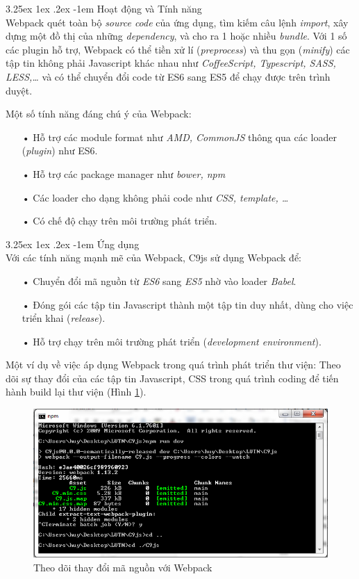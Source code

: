 \documentclass[12pt,a4paper,twoside]{article}
\makeatletter
\newcommand{\myparagraph}[1]{\paragraph{#1}\mbox{}\\} %
\renewcommand\paragraph{\@startsection{paragraph}{5}{\z@}%
  {3.25ex \@plus1ex \@minus.2ex}%
  {-1em}%
  {\normalfont\normalsize\bfseries}}
\makeatother
\begin{document}
\myparagraph{Hoạt động và Tính năng}
Webpack quét toàn bộ \textit{source code} của ứng dụng, tìm kiếm câu lệnh \textit{import}, xây dựng một đồ thị của những \textit{dependency}, và cho ra 1 hoặc nhiều \textit{bundle}. Với 1 số các plugin hỗ trợ, Webpack có thể tiền xử lí (\textit{preprocess}) và thu gọn (\textit{minify}) các tập tin không phải Javascript khác nhau như \textit{CoffeeScript, Typescript, SASS, LESS,…} và có thể chuyển đổi code từ ES6 sang ES5 để chạy được trên trình duyệt.

Một số tính năng đáng chú ý của Webpack:
\begin{itemize}
\item[•] Hỗ trợ các module format như \textit{AMD, CommonJS} thông qua các loader (\textit{plugin}) như ES6.
\item[•] Hỗ trợ các package manager như \textit{bower, npm}
\item[•] Các loader cho dạng không phải code như \textit{CSS, template, …}
\item[•] Có chế độ chạy trên môi trường phát triển.
\end{itemize}

\myparagraph{Ứng dụng}
Với các tính năng mạnh mẽ của Webpack, C9js sử dụng Webpack để:
\begin{itemize}
\item[•] Chuyển đổi mã nguồn từ \textit{ES6} sang \textit{ES5} nhờ vào loader \textit{Babel}.
\item[•] Đóng gói các tập tin Javascript thành một tập tin duy nhất, dùng cho việc triển khai (\textit{release}).
\item[•] Hỗ trợ chạy trên môi trường phát triển (\textit{development environment}).
\end{itemize}

Một ví dụ về việc áp dụng Webpack trong quá trình phát triển thư viện: Theo dõi sự thay đổi của các tập tin Javascript, CSS trong quá trình coding để tiến hành build lại thư viện (Hình \ref{fig:webpack_build}).

\begin{figure}[!h]
	\begin{center}
    \includegraphics[scale=.8]{image/webpack_build}
    \caption{Theo dõi thay đổi mã nguồn với Webpack}
    \label{fig:webpack_build}
	\end{center}
\end{figure}
\end{document}
